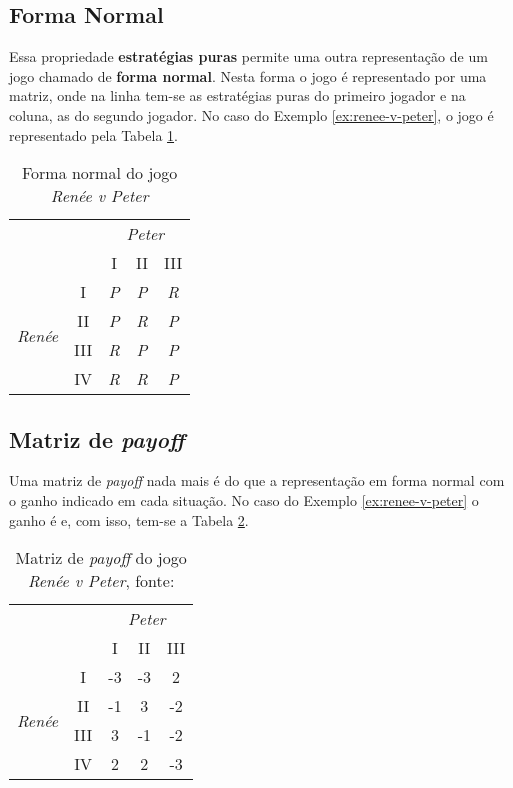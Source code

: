 \subsection{Forma Normal}
\label{subsec:forma-normal}

Essa propriedade \textbf{estratégias puras} permite uma outra representação de um jogo chamado de \textbf{forma normal}. Nesta forma o jogo é representado por uma matriz, onde na linha tem-se as estratégias puras do primeiro jogador e na coluna, as do segundo jogador. No caso do Exemplo \ref{ex:renee-v-peter}, o jogo é representado pela Tabela \ref{tab:forma-normal-do-jogo-renee-v-peter}.

\begin{table}[ht]
\centering
\begin{tabular}{cc|ccc}
\hline
 &  & \multicolumn{3}{c}{\emph{Peter}}\tabularnewline
 &  & I & II & III\tabularnewline
\hline
\multirow{4}{*}{\begin{turn}{90}
\emph{Renée}
\end{turn}} & I & \emph{P} & \emph{P} & \emph{R}\tabularnewline
 & II & \emph{P} & \emph{R} & \emph{P}\tabularnewline
 & III & \emph{R} & \emph{P} & \emph{P}\tabularnewline
 & IV & \emph{R} & \emph{R} & \emph{P}\tabularnewline
\hline
\end{tabular}
\caption{Forma normal do jogo \emph{Renée v Peter}}
\label{tab:forma-normal-do-jogo-renee-v-peter}
\end{table}

\subsection{Matriz de \emph{payoff}}
\label{subsec:matriz-de-payoff}

Uma matriz de \emph{payoff} nada mais é do que a representação em forma normal com o ganho indicado em cada situação. No caso do Exemplo \ref{ex:renee-v-peter} o ganho é e, com isso, tem-se a Tabela \ref{tab:matriz-de-payoff-do-jogo-renee-v-peter}.

\begin{table}[ht]
\centering
\begin{tabular}{cc|ccc}
\hline
 &  & \multicolumn{3}{c}{\emph{Peter}}\tabularnewline
 &  & I & II & III\tabularnewline
\hline
\multirow{4}{*}{\begin{turn}{90}
\emph{Renée}
\end{turn}} & I & -3 & -3 & 2\tabularnewline
 & II & -1 & 3 & -2\tabularnewline
 & III & 3 & -1 & -2\tabularnewline
 & IV & 2 & 2 & -3\tabularnewline
\hline
\end{tabular}
\caption{Matriz de \emph{payoff} do jogo \emph{Renée v Peter}, fonte: \cite{spaniel_2011}}
\label{tab:matriz-de-payoff-do-jogo-renee-v-peter}
\end{table}

